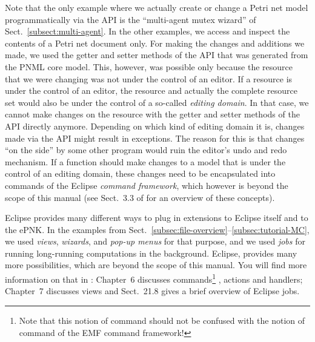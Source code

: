 Note that the only example where we actually create or change a Petri net model
programmatically via the API is the ``multi-agent mutex wizard'' of Sect.~\ref{subsect:multi-agent}. In
the other examples, we access and inspect the contents of a Petri net document only. For
making the changes and additions we made, we used the getter and setter methods of
the API that was generated from the PNML core model. This, however, was possible
only because the resource that we were changing was not under the control of an
editor. If a resource is under the control of an editor, the resource and
actually the complete resource set would also be
under the control of a so-called \emph{editing domain}.%
In that case, we cannot make changes on the resource with the getter and setter
methods of the API directly anymore. Depending on which kind of editing domain
it is, changes made via the API might result in exceptions. The reason for
this is that changes ``on the side'' by some other program would ruin the
editor's undo and redo mechanism. If a function should make changes to a model
that is under the control of an editing domain, these changes need to be
encapsulated into commands of the Eclipse \emph{command framework},%
which however is beyond the scope of this manual (see Sect.~3.3 of \cite{BSM06}
for an overview of these concepts). 

Eclipse provides many different ways to plug in extensions to Eclipse itself and to
the ePNK. In the examples from Sect.~\ref{subsec:file-overview}--\ref{subsec:tutorial-MC},
we used \emph{views}, \emph{wizards}, and \emph{pop-up menus} for that purpose, and
we used \emph{jobs} for running long-running computations in the background. Eclipse,
provides many more possibilities, which are beyond the scope of this manual. You will
find more information on that in \cite{ClRu08}: Chapter~6 discusses commands\footnote
  {Note that this notion of command should not be confused with the notion
   of command of the EMF command framework!}%
, actions and handlers; Chapter~7 discusses views and Sect.~21.8 gives a brief
overview of Eclipse jobs.

